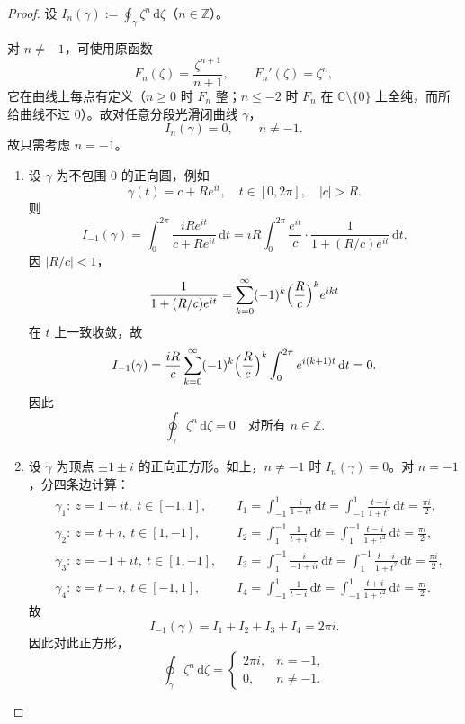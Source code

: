 \documentclass[11pt,a4paper]{article}
\newcommand{\C}{\mathbb{C}}
\newcommand{\dd}{\mathrm{d}}
\theoremstyle{definition}
\begin{document}
\begin{proof}
设 $I_n(\gamma):=\oint_\gamma \zeta^n\,\dd\zeta$（$n\in\mathbb{Z}$）。

对 $n\neq -1$，可使用原函数
\[
  F_n(\zeta)=\frac{\zeta^{n+1}}{n+1},\qquad F_n'(\zeta)=\zeta^n,
\]
它在曲线上每点有定义（$n\ge 0$ 时 $F_n$ 整；$n\le -2$ 时 $F_n$ 在 $\C\setminus\{0\}$ 上全纯，而所给曲线不过 $0$）。故对任意分段光滑闭曲线 $\gamma$，
\[
  I_n(\gamma)=0,\qquad n\neq -1.
\]
故只需考虑 $n=-1$。

\begin{enumerate}
  \item[(a)] 设 $\gamma$ 为不包围 $0$ 的正向圆，例如
    \[
      \gamma(t)=c+Re^{it},\quad t\in[0,2\pi],\quad |c|>R.
    \]
    则
    \[
      I_{-1}(\gamma)
      =\int_0^{2\pi}\frac{iRe^{it}}{c+Re^{it}}\,\dd t
      =iR\int_0^{2\pi}\frac{e^{it}}{c}\cdot\frac{1}{1+(R/c)e^{it}}\,\dd t.
    \]
    因 $|R/c|<1$，
    \[
      \frac{1}{1+(R/c)e^{it}}=\sum_{k=0}^{\infty}(-1)^k\Bigl(\frac{R}{c}\Bigr)^k
      e^{ikt}
    \]
    在 $t$ 上一致收敛，故
    \[
      I_{-1}(\gamma)
      =\frac{iR}{c}\sum_{k=0}^{\infty}(-1)^k\Bigl(\frac{R}{c}\Bigr)^k
      \int_0^{2\pi}e^{i(k+1)t}\,\dd t=0.
    \]
    因此
    \[
      \oint_\gamma \zeta^n\,\dd\zeta=0\quad\text{对所有 }n\in\mathbb{Z}.
    \]

  \item[(b)] 设 $\gamma$ 为顶点 $\pm1\pm i$ 的正向正方形。如上，$n\neq -1$ 时 $I_n(\gamma)=0$。对 $n=-1$，分四条边计算：
    \[
      \begin{aligned}
        &\gamma_1:\ z=1+it,\ t\in[-1,1],
        &&I_1=\int_{-1}^{1}\frac{i}{1+it}\,\dd t
        =\int_{-1}^{1}\frac{t-i}{1+t^2}\,\dd t=\frac{\pi i}{2},\\
        &\gamma_2:\ z=t+i,\ t\in[1,-1],
        &&I_2=\int_{1}^{-1}\frac{1}{t+i}\,\dd t
        =\int_{1}^{-1}\frac{t-i}{1+t^2}\,\dd t=\frac{\pi i}{2},\\
        &\gamma_3:\ z=-1+it,\ t\in[1,-1],
        &&I_3=\int_{1}^{-1}\frac{i}{-1+it}\,\dd t
        =\int_{1}^{-1}\frac{t-i}{1+t^2}\,\dd t=\frac{\pi i}{2},\\
        &\gamma_4:\ z=t-i,\ t\in[-1,1],
        &&I_4=\int_{-1}^{1}\frac{1}{t-i}\,\dd t
        =\int_{-1}^{1}\frac{t+i}{1+t^2}\,\dd t=\frac{\pi i}{2}.
      \end{aligned}
    \]
    故
    \[
      I_{-1}(\gamma)=I_1+I_2+I_3+I_4=2\pi i.
    \]
    因此对此正方形，
    \[
      \oint_\gamma \zeta^n\,\dd\zeta=
      \begin{cases}
        2\pi i, & n=-1,\\
        0, & n\neq -1.
      \end{cases}
    \]
\end{enumerate}
\end{proof}
\end{document}
